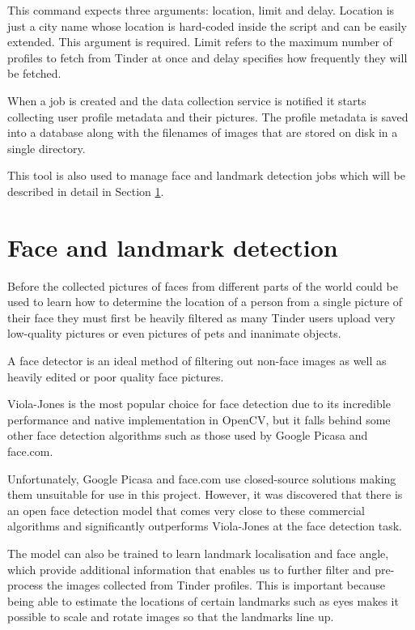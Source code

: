 This command expects three arguments: location, limit and delay. Location is 
just a city name whose location is hard-coded inside the script and can be 
easily extended. This argument is required. Limit refers to the maximum number 
of profiles to fetch from Tinder at once and delay specifies how frequently 
they will be fetched.

When a job is created and the data collection service is notified it starts
collecting user profile metadata and their pictures. The profile metadata is
saved into a database along with the filenames of images that are stored on
disk in a single directory.

This tool is also used to manage face and landmark detection jobs which will 
be described in detail in Section \ref{spec:fd}. 

\section{Face and landmark detection}
\label{spec:fd}
Before the collected pictures of faces from different parts of the world 
could be used to learn how to determine the location of a person from a single 
picture of their face they must first be heavily filtered as many Tinder users 
upload very low-quality pictures or even pictures of pets and inanimate 
objects.

A face detector is an ideal method of filtering out non-face images as well as
heavily edited or poor quality face pictures. 

Viola-Jones is the most popular choice for face detection due to its 
incredible performance and native implementation in OpenCV, but it falls 
behind some other face detection algorithms such as those used by 
Google Picasa and face.com.

Unfortunately, Google Picasa and face.com use closed-source 
solutions making them unsuitable for use in this project. However, it was 
discovered that there is an open face detection model that comes very close 
to these commercial algorithms and significantly outperforms Viola-Jones at
the face detection task.

The model can also be trained to learn landmark localisation and face angle, 
which provide additional information that enables us to further filter and 
pre-process the images collected from Tinder profiles. This is important 
because being able to estimate the locations of certain landmarks such as eyes 
makes it possible to scale and rotate images so that the landmarks line up.

